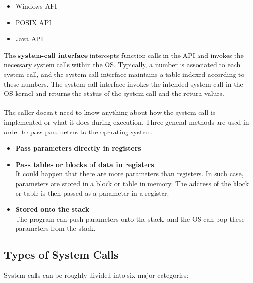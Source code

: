 \documentclass{article}
\begin{document}
\begin{itemize}
	\item Windows API
	\item POSIX API
	\item Java API
\end{itemize}
The \textbf{system-call interface} intercepts function calls in the API and invokes the necessary system calls within the OS. Typically, a number is associated to each system call, and the system-call interface maintains a table indexed according to these numbers. The system-call interface invokes the intended system call in the OS kernel and returns the status of the system call and the return values. \\ \\
The caller doesn't need to know anything about how the system call is implemented or what it does during execution. Three general methods are used in order to pass parameters to the operating system:
\begin{itemize}
	\item \textbf{Pass parameters directly in registers}
	\item \textbf{Pass tables or blocks of data in registers}
	\vspace{.2cm} \\
	It could happen that there are more parameters than registers. In such case, parameters are stored in a block or table in memory. The address of the block or table is then passed as a parameter in a register.
	
	\item \textbf{Stored onto the stack}
	\vspace{.2cm} \\
	The program can push parameters onto the stack, and the OS can pop these parameters from the stack.
\end{itemize}

\subsection{Types of System Calls}
System calls can be roughly divided into six major categories:
\end{document}
